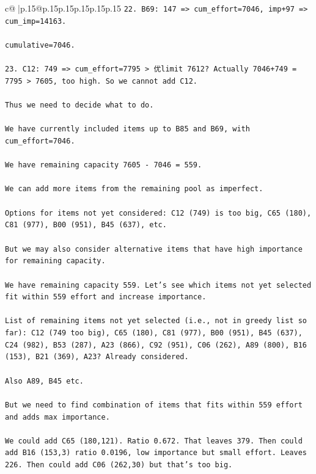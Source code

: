 \documentclass{article}
\begin{document}
{\begin{supertabular}{c@{$\;$}|p{.15\linewidth}@{}p{.15\linewidth}p{.15\linewidth}p{.15\linewidth}p{.15\linewidth}p{.15\linewidth}}
{{{\texttt{22. B69: 147 => cum\_effort=7046, imp+97 => cum\_imp=14163.} \\
\\ 
\texttt{cumulative=7046.} \\
\\ 
\texttt{23. C12: 749 => cum\_effort=7795 > 优limit 7612? Actually 7046+749 = 7795 > 7605, too high. So we cannot add C12.} \\
\\ 
\texttt{Thus we need to decide what to do.} \\
\\ 
\texttt{We have currently included items up to B85 and B69, with cum\_effort=7046.} \\
\\ 
\texttt{We have remaining capacity 7605 {-} 7046 = 559.} \\
\\ 
\texttt{We can add more items from the remaining pool as imperfect.} \\
\\ 
\texttt{Options for items not yet considered: C12 (749) is too big, C65 (180), C81 (977), B00 (951), B45 (637), etc.} \\
\\ 
\texttt{But we may also consider alternative items that have high importance for remaining capacity.} \\
\\ 
\texttt{We have remaining capacity 559. Let's see which items not yet selected fit within 559 effort and increase importance.} \\
\\ 
\texttt{List of remaining items not yet selected (i.e., not in greedy list so far): C12 (749 too big), C65 (180), C81 (977), B00 (951), B45 (637), C24 (982), B53 (287), A23 (866), C92 (951), C06 (262), A89 (800), B16 (153), B21 (369), A23? Already considered.} \\
\\ 
\texttt{Also A89, B45 etc.} \\
\\ 
\texttt{But we need to find combination of items that fits within 559 effort and adds max importance.} \\
\\ 
\texttt{We could add C65 (180,121). Ratio 0.672. That leaves 379. Then could add B16 (153,3) ratio 0.0196, low importance but small effort. Leaves 226. Then could add C06 (262,30) but that's too big.} \\
\\ 
}}}
\end{supertabular}}
\end{document}

